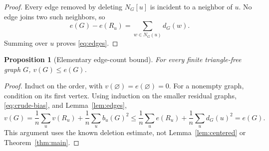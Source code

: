 \documentclass[11pt]{article}
\newtheorem{proposition}[theorem]{Proposition}
\begin{document}
\begin{proof}
Every edge removed by deleting $N_G[u]$ is incident to a neighbor of $u$. No edge joins two such neighbors, so
\[
 e(G)-e(R_u)=\sum_{w\in N_G(u)}d_G(w).
\]
Summing over $u$ proves \eqref{eq:edges}.
\end{proof}

\begin{proposition}[Elementary edge-count bound]\label{prop:baseline}
For every finite triangle-free graph $G$, $v(G)\le e(G)$.
\end{proposition}

\begin{proof}
Induct on the order, with $v(\varnothing)=e(\varnothing)=0$. For a nonempty graph, condition on its first vertex. Using induction on the smaller residual graphs, \eqref{eq:crude-bias}, and Lemma~\ref{lem:edges},
\[
 v(G)=\frac1n\sum_u v(R_u)+\frac1n\sum_u b_u(G)^2
 \le\frac1n\sum_u e(R_u)+\frac1n\sum_u d_G(u)^2=e(G).
\]
This argument uses the known deletion estimate, not Lemma~\ref{lem:centered} or Theorem~\ref{thm:main}.
\end{proof}
\end{document}
